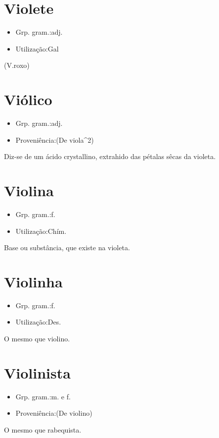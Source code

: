 \documentclass{article}
\begin{document}
\section{Violete}
\begin{itemize}
\item {Grp. gram.:adj.}
\end{itemize}
\begin{itemize}
\item {Utilização:Gal}
\end{itemize}
(V.roxo)
\section{Viólico}
\begin{itemize}
\item {Grp. gram.:adj.}
\end{itemize}
\begin{itemize}
\item {Proveniência:(De \textunderscore viola\textunderscore ^2)}
\end{itemize}
Diz-se de um ácido crystallino, extrahido das pétalas sêcas da violeta.
\section{Violina}
\begin{itemize}
\item {Grp. gram.:f.}
\end{itemize}
\begin{itemize}
\item {Utilização:Chím.}
\end{itemize}
Base ou substância, que existe na violeta.
\section{Violinha}
\begin{itemize}
\item {Grp. gram.:f.}
\end{itemize}
\begin{itemize}
\item {Utilização:Des.}
\end{itemize}
O mesmo que \textunderscore violino\textunderscore .
\section{Violinista}
\begin{itemize}
\item {Grp. gram.:m.  e  f.}
\end{itemize}
\begin{itemize}
\item {Proveniência:(De \textunderscore violino\textunderscore )}
\end{itemize}
O mesmo que \textunderscore rabequista\textunderscore .
\end{document}
